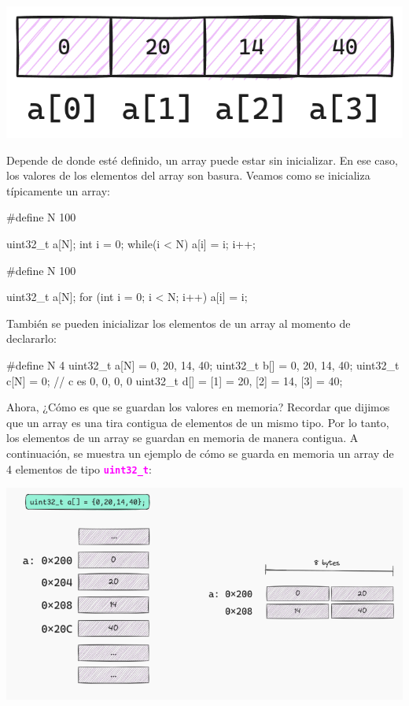\documentclass[]{scrartcl}
\newcommand{\hl}[1]{\textcolor{magenta}{\textbf{\texttt{#1}}}}
\begin{document}
\begin{center}
  \includegraphics[scale=0.25]{./img/array.png}
  \label{fig:array}
\end{center}

Depende de donde esté definido, un array puede estar sin inicializar. En ese caso, los valores de los elementos del array son basura. Veamos como se inicializa típicamente un array:

\begin{cbox}[]{}
  #define N 100

  uint32_t a[N];
  int i = 0;
  while(i < N){
    a[i] = i;
    i++;
  }
\end{cbox}

\begin{cbox}[]{}
  #define N 100

  uint32_t a[N];
  for (int i = 0; i < N; i++){
    a[i] = i;
  }
\end{cbox}

También se pueden inicializar los elementos de un array al momento de declararlo:

\begin{cbox}[]{}
#define N 4
uint32_t a[N] = {0, 20, 14, 40};
uint32_t b[] = {0, 20, 14, 40};
uint32_t c[N] = {0}; // c es {0, 0, 0, 0}
uint32_t d[] = {[1] = 20, [2] = 14, [3] = 40};
\end{cbox}


Ahora, ¿Cómo es que se guardan los valores en memoria?
Recordar que dijimos que un array es una tira contigua de elementos de un mismo tipo. Por lo tanto, los elementos de un array se guardan en memoria de manera contigua. A continuación, se muestra un ejemplo de cómo se guarda en memoria un array de 4 elementos de tipo \hl{uint32\_t}:

\begin{center}
  \includegraphics[scale=0.5]{./img/array_memoria.png}
  \label{fig:array_memoria}
\end{center}
\end{document}
